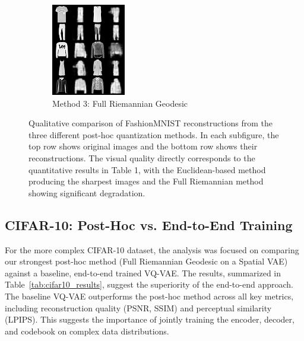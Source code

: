 \documentclass{article}
\begin{document}
\begin{figure}[!p]
\begin{subfigure}[b]{0.32\textwidth}
        \includegraphics[width=\linewidth]{images/fashion_spatial_geodesic_comparison_grid.png}
        \caption{Method 3: Full Riemannian Geodesic}
        \label{fig:full_recon}
    \end{subfigure}
    \caption{Qualitative comparison of FashionMNIST reconstructions from the three different post-hoc quantization methods. In each subfigure, the top row shows original images and the bottom row shows their reconstructions. The visual quality directly corresponds to the quantitative results in Table 1, with the Euclidean-based method producing the sharpest images and the Full Riemannian method showing significant degradation.}
    \label{fig:fashion_recon}
\end{figure}

\subsection{CIFAR-10: Post-Hoc vs. End-to-End Training}
For the more complex CIFAR-10 dataset, the analysis was focused on comparing our strongest post-hoc method (Full Riemannian Geodesic on a Spatial VAE) against a baseline, end-to-end trained VQ-VAE. The results, summarized in Table~\ref{tab:cifar10_results}, suggest the superiority of the end-to-end approach. The baseline VQ-VAE outperforms the post-hoc method across all key metrics, including reconstruction quality (PSNR, SSIM) and perceptual similarity (LPIPS). This suggests the importance of jointly training the encoder, decoder, and codebook on complex data distributions.
\end{document}
